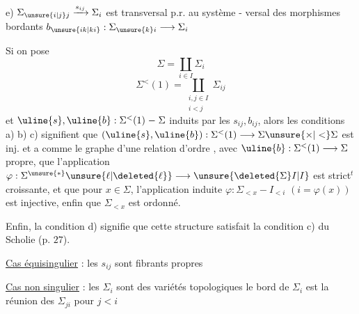 e) $\Sigma_{\unsure{i|j}j}\xrightarrow{s_{ij}}\Sigma_i$ est transversal p.r. au système -
versal des morphismes bordants
$b_{\unsure{ik|ki}}:\Sigma_{\unsure{k}i}\longrightarrow\Sigma_i$

Si on pose
\[
\Sigma=\coprod_{i\in I}\Sigma_i
\]
\[
\Sigma^{<}(1)=\coprod_{\substack{i,j\in I\\i<j}}\Sigma_{ij}
\]
et $\uline{s},\uline{b}:\Sigma^{<}(1)\mathrel{-}\Sigma$ induits par les
$s_{ij},b_{ij}$, alors les conditions a) b) c)
signifient que $(\uline{s},\uline{b}):\Sigma^{<}(1)\longrightarrow\Sigma\unsure{\times|<}\Sigma$ est
inj. et a comme  le graphe d'une
relation d'ordre , avec $\uline{b}:\Sigma^{<}(1)\longrightarrow\Sigma$
 propre,  que l'application  $\varphi:\Sigma^{\unsure{*}}\unsure{\ell|\deleted{\ell}}\longrightarrow\unsure{\deleted{\Sigma}I|I}$
est strict\({}^t\) croissante, et que pour  $x\in\Sigma$,
l'application induite $\varphi:\Sigma_{<x}\mathrel{-}I_{<i}$ $(i=\varphi(x))$ est
injective, enfin que $\Sigma_{<x}$ est  ordonné.

Enfin, la condition d) signifie que cette structure
satisfait la condition c) du Scholie (p. $27$).

\uline{Cas équisingulier} : les $s_{ij}$ sont fibrants propres

\uline{Cas non singulier} : les $\Sigma_i$ sont des variétés
topologiques\unsure{,|;} le bord de $\Sigma_i$ est la réunion
des $\Sigma_{ji}$ pour $j<i$ 

